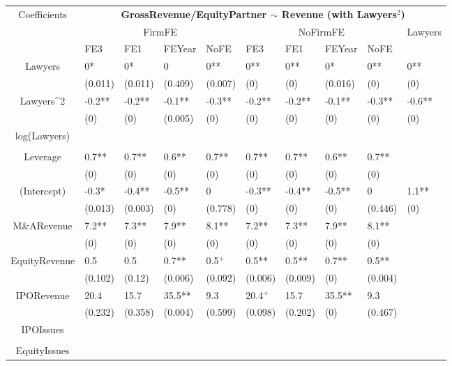 \documentclass{article}
\begin{document}
\begin{table}[H]
\centering
\begin{tabular}{|clllllllll|}
\hline
\multirow{3}{*}{Coefficients} & \multicolumn{9}{c|}{\textbf{GrossRevenue/EquityPartner $\sim$ Revenue (with Lawyers$^2$)}} \\
\cline{2-10}
& \multicolumn{4}{c}{FirmFE} & \multicolumn{4}{c}{NoFirmFE} & \multirow{2}{*}{Lawyers} \\
\cline{2-9}
& FE3 & FE1 & FEYear & NoFE & FE3 & FE1 & FEYear & NoFE &  \\
\hline
 
Lawyers & 0* & 0* & 0 & 0** & 0** & 0** & 0* & 0** & 0** \\ 
   & (0.011) & (0.011) & (0.409) & (0.007) & (0) & (0) & (0.016) & (0) & (0) \\ 
  Lawyers^2 & -0.2** & -0.2** & -0.1** & -0.3** & -0.2** & -0.2** & -0.1** & -0.3** & -0.6** \\ 
   & (0) & (0) & (0.005) & (0) & (0) & (0) & (0) & (0) & (0) \\ 
  log(Lawyers) &  &  &  &  &  &  &  &  &  \\ 
   &  &  &  &  &  &  &  &  &  \\ 
  Leverage & 0.7** & 0.7** & 0.6** & 0.7** & 0.7** & 0.7** & 0.6** & 0.7** &  \\ 
   & (0) & (0) & (0) & (0) & (0) & (0) & (0) & (0) &  \\ 
  (Intercept) & -0.3* & -0.4** & -0.5** & 0 & -0.3** & -0.4** & -0.5** & 0 & 1.1** \\ 
   & (0.013) & (0.003) & (0) & (0.778) & (0) & (0) & (0) & (0.446) & (0) \\ 
  M\&ARevenue & 7.2** & 7.3** & 7.9** & 8.1** & 7.2** & 7.3** & 7.9** & 8.1** &  \\ 
   & (0) & (0) & (0) & (0) & (0) & (0) & (0) & (0) &  \\ 
  EquityRevenue & 0.5 & 0.5 & 0.7** & 0.5$^{+}$ & 0.5** & 0.5** & 0.7** & 0.5** &  \\ 
   & (0.102) & (0.12) & (0.006) & (0.092) & (0.006) & (0.009) & (0) & (0.004) &  \\ 
  IPORevenue & 20.4 & 15.7 & 35.5** & 9.3 & 20.4$^{+}$ & 15.7 & 35.5** & 9.3 &  \\ 
   & (0.232) & (0.358) & (0.004) & (0.599) & (0.098) & (0.202) & (0) & (0.467) &  \\ 
  IPOIssues &  &  &  &  &  &  &  &  &  \\ 
   &  &  &  &  &  &  &  &  &  \\ 
  EquityIssues &  &  &  &  &  &  &  &  &  \\ 

\end{tabular}
\end{table}
\end{document}
